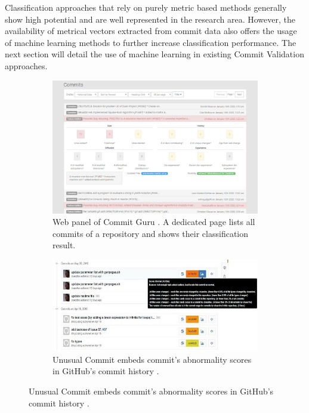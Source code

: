 Classification approaches that rely on purely metric based methods generally show high potential and are well represented in the research area. However, the availability of metrical vectors extracted from commit data also offers the usage of machine learning methods to further increase classification performance. The next section will detail the use of machine learning in existing Commit Validation approaches.

\begin{figure}[p!]
	\centering
	
	\begin{subfigure}[t]{\textwidth}
		\centering
		\includegraphics[width=.75\textwidth]{images/ui/commitguru/screenshot-repo-commits-buggy-smaller}
		\caption{Web panel of Commit Guru \cite{Rosen2015}. A dedicated page lists all commits of a repository and shows their classification result.}
		\label{fig:ui-commitguru}
	\end{subfigure}
	
	\begin{subfigure}[t]{.75\textwidth}
		\includegraphics[width=\textwidth]{images/ui/unusualcommits/github-integration2-smaller}
		\caption{Unusual Commit embeds commit's abnormality scores in GitHub's commit history \cite{Goyal2017}.}
		\label{fig:ui-unusualcommits-history}
	\end{subfigure}
	

\end{figure}
